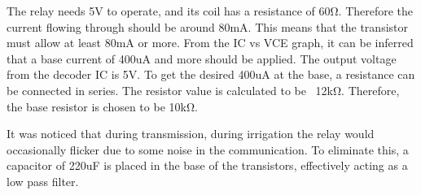 The relay needs 5V to operate, and its coil has a resistance of 60Ω.
Therefore the current flowing through should be around 80mA. This
means that the transistor must allow at least 80mA or more. From the
IC vs VCE graph, it can be inferred that a base current of 400uA and
more should be applied. The output voltage from the decoder IC is 5V.
To get the desired 400uA at the base, a resistance can be connected
in series. The resistor value is calculated to be ~12kΩ. Therefore,
the base resistor is chosen to be 10kΩ.

It was noticed that during transmission, during irrigation the relay
would occasionally flicker due to some noise in the communication. To
eliminate this, a capacitor of  220uF is placed in the base of the
transistors, effectively acting as a low pass filter.
